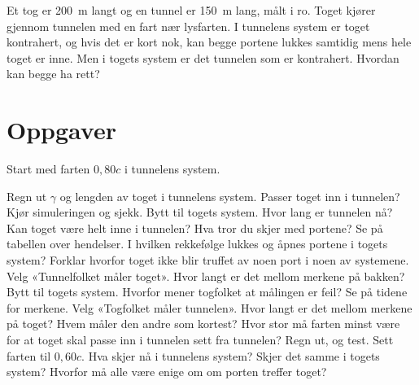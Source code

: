 \documentclass[11pt]{article}
\begin{document}

Et tog er 200~m langt og en tunnel er 150~m lang, målt i ro. Toget kjører gjennom tunnelen med en fart nær lysfarten. I tunnelens system er toget kontrahert, og hvis det er kort nok, kan begge portene lukkes samtidig mens hele toget er inne. Men i togets system er det tunnelen som er kontrahert. Hvordan kan begge ha rett?

\section*{Oppgaver}

Start med farten $0{,}80c$ i tunnelens system.

\begin{oppgaveliste}
\oppgave {}Regn ut $γ$ og lengden av toget i tunnelens system. Passer toget inn i tunnelen? Kjør simuleringen og sjekk.
\svar
\oppgave {}Bytt til togets system. Hvor lang er tunnelen nå? Kan toget være helt inne i tunnelen? Hva tror du skjer med portene?
\svar
\oppgave {}Se på tabellen over hendelser. I hvilken rekkefølge lukkes og åpnes portene i togets system? Forklar hvorfor toget ikke blir truffet av noen port i noen av systemene.
\svar
\oppgave {}Velg «Tunnelfolket måler toget». Hvor langt er det mellom merkene på bakken? Bytt til togets system. Hvorfor mener togfolket at målingen er feil? Se på tidene for merkene.
\svar
\oppgave {}Velg «Togfolket måler tunnelen». Hvor langt er det mellom merkene på toget? Hvem måler den andre som kortest?
\svar
\oppgave {}Hvor stor må farten minst være for at toget skal passe inn i tunnelen sett fra tunnelen? Regn ut, og test.
\svar
\oppgave {}Sett farten til $0{,}60c$. Hva skjer nå i tunnelens system? Skjer det samme i togets system? Hvorfor må alle være enige om om porten treffer toget?
\svar
\end{oppgaveliste}
\end{document}
